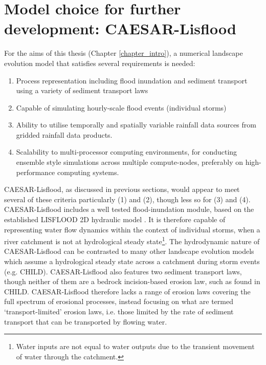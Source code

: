 \section{Model choice for further development: CAESAR-Lisflood}

For the aims of this thesis (Chapter \ref{chapter_intro}), a numerical landscape evolution model that satisfies several requirements is needed:

\begin{enumerate}
\item Process representation including flood inundation and sediment transport using a variety of sediment transport laws
\item Capable of simulating hourly-scale flood events (individual storms)
\item Ability to utilise temporally and spatially variable rainfall data sources from gridded rainfall data products.
\item Scalability to multi-processor computing environments, for conducting ensemble style simulations across multiple compute-nodes, preferably on high-performance computing systems.
\end{enumerate}


CAESAR-Lisflood, as discussed in previous sections, would appear to meet several of these criteria particularly (1) and (2), though less so for (3) and (4). CAESAR-Lisflood includes a well tested flood-inundation module, based on the established LISFLOOD 2D hydraulic model \citep{Bates1998}. It is therefore capable of representing water flow dynamics within the context of individual storms, when a river catchment is not at hydrological steady state\footnote{Water inputs are not equal to water outputs due to the transient movement of water through the catchment.}. The hydrodynamic nature of CAESAR-Lisflood can be contrasted to many other landscape evolution models which assume a hydrological steady state across a catchment during storm events (e.g. CHILD). CAESAR-Lisflood also features two sediment transport laws, though neither of them are a bedrock incision-based erosion law, such as found in CHILD. CAESAR-Lisflood therefore lacks a range of erosion laws covering the full spectrum of erosional processes, instead focusing on what are termed `transport-limited' erosion laws, i.e. those limited by the rate of sediment transport that can be transported by flowing water. 

